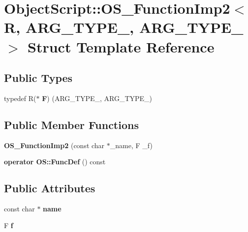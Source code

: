 \hypertarget{struct_object_script_1_1_o_s___function_imp2}{}\section{Object\+Script\+:\+:O\+S\+\_\+\+Function\+Imp2$<$ R, A\+R\+G\+\_\+\+T\+Y\+P\+E\+\_, A\+R\+G\+\_\+\+T\+Y\+P\+E\+\_ $>$ Struct Template Reference}
\label{struct_object_script_1_1_o_s___function_imp2}
\subsection*{Public Types}
\begin{DoxyCompactItemize}
\item 
typedef R($\ast$ {\bfseries F}) (A\+R\+G\+\_\+\+T\+Y\+P\+E\+\_, A\+R\+G\+\_\+\+T\+Y\+P\+E\+\_)\hypertarget{struct_object_script_1_1_o_s___function_imp2_a778a7d5dc0ceacafd4adae89b108ceaa}{}\label{struct_object_script_1_1_o_s___function_imp2_a778a7d5dc0ceacafd4adae89b108ceaa}

\end{DoxyCompactItemize}
\subsection*{Public Member Functions}
\begin{DoxyCompactItemize}
\item 
{\bfseries O\+S\+\_\+\+Function\+Imp2} (const char $\ast$\+\_\+name, F \+\_\+f)\hypertarget{struct_object_script_1_1_o_s___function_imp2_ad0a945d9e687580b3624b186446e977f}{}\label{struct_object_script_1_1_o_s___function_imp2_ad0a945d9e687580b3624b186446e977f}

\item 
{\bfseries operator O\+S\+::\+Func\+Def} () const \hypertarget{struct_object_script_1_1_o_s___function_imp2_a4f46bcd1757c95af5bff4fbb75f95584}{}\label{struct_object_script_1_1_o_s___function_imp2_a4f46bcd1757c95af5bff4fbb75f95584}

\end{DoxyCompactItemize}
\subsection*{Public Attributes}
\begin{DoxyCompactItemize}
\item 
const char $\ast$ {\bfseries name}\hypertarget{struct_object_script_1_1_o_s___function_imp2_a0bf8db9e2340d3f2f11808b354573e52}{}\label{struct_object_script_1_1_o_s___function_imp2_a0bf8db9e2340d3f2f11808b354573e52}

\item 
F {\bfseries f}\hypertarget{struct_object_script_1_1_o_s___function_imp2_a4c631a0172f3b2d4b6eeb787f0c36552}{}\label{struct_object_script_1_1_o_s___function_imp2_a4c631a0172f3b2d4b6eeb787f0c36552}

\end{DoxyCompactItemize}


